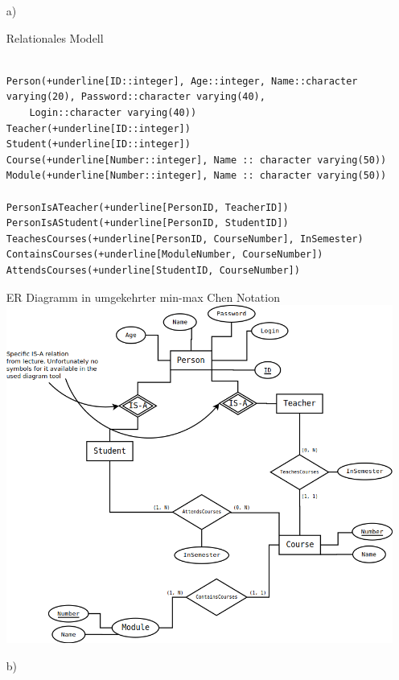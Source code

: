 \begin{itemize}

\item[a)]

Relationales Modell \\

\begin{Verbatim}[commandchars=+\[\]]

Person(+underline[ID::integer], Age::integer, Name::character varying(20), Password::character varying(40),
	Login::character varying(40))
Teacher(+underline[ID::integer])
Student(+underline[ID::integer])
Course(+underline[Number::integer], Name :: character varying(50))
Module(+underline[Number::integer], Name :: character varying(50))

PersonIsATeacher(+underline[PersonID, TeacherID])
PersonIsAStudent(+underline[PersonID, StudentID])
TeachesCourses(+underline[PersonID, CourseNumber], InSemester)
ContainsCourses(+underline[ModuleNumber, CourseNumber])
AttendsCourses(+underline[StudentID, CourseNumber])
\end{Verbatim}

ER Diagramm in umgekehrter min-max Chen Notation \\

\includegraphics[width=\textwidth]{./src/exercise3_A.png}


\item[b)] 


\end{itemize}
